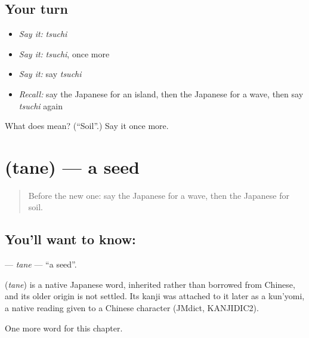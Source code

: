 \subsection*{Your turn}
\begin{itemize}
\raggedright
  \item \emph{Say it:} \emph{tsuchi}
  \item \emph{Say it:} \emph{tsuchi}, once more
  \item \emph{Say it:} say \emph{tsuchi}
  \item \emph{Recall:} say the Japanese for an island, then the Japanese for a wave, then say \emph{tsuchi} again
\end{itemize}

\begin{tcolorbox}[breakable,colback=teal!4,colframe=teal!35!black,title={Before you move on}]
What does  mean? (\textquotedblleft{}Soil\textquotedblright{}.) Say it once more.
\end{tcolorbox}
\section[\texorpdfstring{\ja{たね} (tane)}{たね (tane)}]{ (tane) — a seed}

\label{lesson:JA-C44-tane}



\begin{quote}
Before the new one: say the Japanese for a wave, then the Japanese for soil.
\end{quote}

\subsection*{You'll want to know: }
\textbf{} — \emph{tane} — \textquotedblleft{}a seed\textquotedblright{}.

\begin{cousinweb}
\textbf{} (\emph{tane}) is a native Japanese word, inherited rather than borrowed from Chinese, and its older origin is not settled. Its kanji was attached to it later as a kun'yomi, a native reading given to a Chinese character (JMdict, KANJIDIC2).
\end{cousinweb}

\begin{grammarlens}[title={What you've built}]
One more word for this chapter.
\end{grammarlens}

